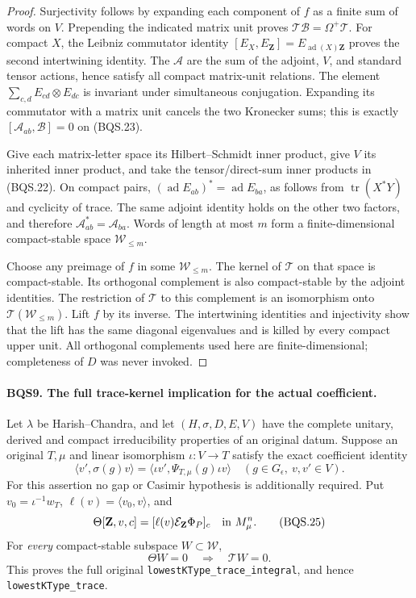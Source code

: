 \begin{proof}
Surjectivity follows by expanding each component of $f$ as a finite sum
of words on $V$.  Prepending the indicated matrix unit proves
$\mathcal T\mathcal B=\Omega^+\mathcal T$.
For compact $X$, the Leibniz commutator identity
$[E_X,E_{\mathbf Z}]=E_{\operatorname{ad}(X)\mathbf Z}$
proves the second intertwining identity.
The $\mathcal A$ are the sum of the adjoint, $V$, and standard tensor
actions, hence satisfy all compact matrix-unit relations.
The element $\sum_{c,d}E_{cd}\otimes E_{dc}$ is invariant under
simultaneous conjugation.  Expanding its commutator with a matrix unit
cancels the two Kronecker sums; this is exactly
$[\mathcal A_{ab},\mathcal B]=0$ on (BQS.23).

Give each matrix-letter space its Hilbert--Schmidt inner product, give
$V$ its inherited inner product, and take the tensor/direct-sum inner
products in (BQS.22).  On compact pairs,
$(\operatorname{ad}E_{ab})^*=\operatorname{ad}E_{ba}$,
as follows from $\operatorname{tr}(X^*Y)$ and cyclicity of trace.
The same adjoint identity holds on the other two factors, and therefore
$\mathcal A_{ab}^*=\mathcal A_{ba}$.
Words of length at most $m$ form a finite-dimensional compact-stable
space $\mathcal W_{\le m}$.

Choose any preimage of $f$ in some $\mathcal W_{\le m}$.
The kernel of $\mathcal T$ on that space is compact-stable.  Its
orthogonal complement is also compact-stable by the adjoint identities.
The restriction of $\mathcal T$ to this complement is an isomorphism
onto $\mathcal T(\mathcal W_{\le m})$.
Lift $f$ by its inverse.  The intertwining identities and injectivity
show that the lift has the same diagonal eigenvalues and is killed
by every compact upper unit.  All orthogonal complements used here
are finite-dimensional; completeness of $D$ was never invoked.
\end{proof}

\paragraph{BQS9. The full trace-kernel implication for the actual coefficient.}
\label{claim:BQS9}
Let $\lambda$ be Harish--Chandra, and let $(H,\sigma,D,E,V)$
have the complete unitary, derived and compact irreducibility
properties of an original datum.  Suppose an original
$T,\mu$ and linear isomorphism $\iota:V\to T$ satisfy the exact coefficient
identity
\[
 \langle v',\sigma(g)v\rangle
       =\langle\iota v',\Psi_{T,\mu}(g)\iota v\rangle
       \quad(g\in G_\epsilon,\ v,v'\in V).
 \tag{BQS.24}
\]
For this assertion no gap or Casimir hypothesis is additionally required.
Put $v_0=\iota^{-1}w_T$, $\ell(v)=\langle v_0,v\rangle$, and
\[
 \Theta[\mathbf Z,v,c]
       =[\ell(v)\mathcal E_{\mathbf Z}\Phi_P]_c
                   \quad\hbox{in }M_\mu^n.
 \tag{BQS.25}
\]
For \emph{every} compact-stable subspace $W\subset\mathcal W$,
\[
                    \Theta W=0\quad\Longrightarrow\quad\mathcal T W=0.
 \tag{BQS.26}
\]
This proves the full original \texttt{lowestKType\_trace\_integral},
and hence \texttt{lowestKType\_trace}.

